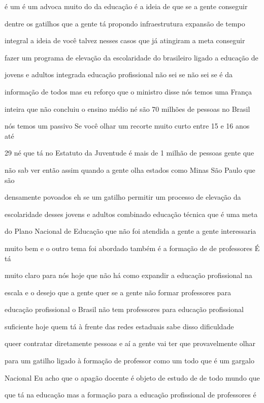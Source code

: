 \documentclass[a4paper,12pt]{article}
\begin{document}
é um é um advoca muito do da educação é a ideia de que se a gente conseguir

dentre os gatilhos que a gente tá propondo infraestrutura expansão de tempo

integral a ideia de você talvez nesses casos que já atingiram a meta conseguir

fazer um programa de elevação da escolaridade do brasileiro ligado a educação de

jovens e adultos integrada educação profissional não sei se não sei se é da

informação de todos mas eu reforço que o ministro disse nós temos uma França

inteira que não concluiu o ensino médio né são 70 milhões de pessoas no Brasil

nós temos um passivo Se você olhar um recorte muito curto entre 15 e 16 anos até

29 né que tá no Estatuto da Juventude é mais de 1 milhão de pessoas gente que

não sab ver então assim quando a gente olha estados como Minas São Paulo que são

densamente povoados eh se um gatilho permitir um processo de elevação da

escolaridade desses jovens e adultos combinado educação técnica que é uma meta

do Plano Nacional de Educação que não foi atendida a gente a gente interessaria

muito bem e o outro tema foi abordado também é a formação de de professores É tá

muito claro para nós hoje que não há como expandir a educação profissional na

escala e o desejo que a gente quer se a gente não formar professores para

educação profissional o Brasil não tem professores para educação profissional

suficiente hoje quem tá à frente das redes estaduais sabe disso dificuldade

queer contratar diretamente pessoas e aí a gente vai ter que provavelmente olhar

para um gatilho ligado à formação de professor como um todo que é um gargalo

Nacional Eu acho que o apagão docente é objeto de estudo de de todo mundo que

que tá na educação mas a formação para a educação profissional de professores é
\end{document}
